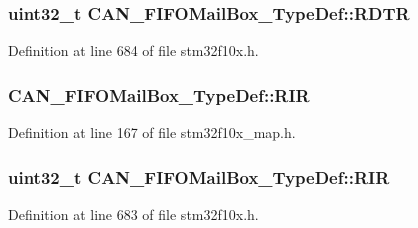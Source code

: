 \subsubsection[{\texorpdfstring{R\+D\+TR}{RDTR}}]{ {\bf uint32\+\_\+t} C\+A\+N\+\_\+\+F\+I\+F\+O\+Mail\+Box\+\_\+\+Type\+Def\+::\+R\+D\+TR}\hypertarget{struct_c_a_n___f_i_f_o_mail_box___type_def_a49d74ca8b402c2b9596bfcbe4cd051a9}{}\label{struct_c_a_n___f_i_f_o_mail_box___type_def_a49d74ca8b402c2b9596bfcbe4cd051a9}


Definition at line 684 of file stm32f10x.\+h.

\subsubsection[{\texorpdfstring{R\+IR}{RIR}}]{ C\+A\+N\+\_\+\+F\+I\+F\+O\+Mail\+Box\+\_\+\+Type\+Def\+::\+R\+IR}\hypertarget{struct_c_a_n___f_i_f_o_mail_box___type_def_a6bf9997062a89922d829e5339f891997}{}\label{struct_c_a_n___f_i_f_o_mail_box___type_def_a6bf9997062a89922d829e5339f891997}


Definition at line 167 of file stm32f10x\+\_\+map.\+h.

\subsubsection[{\texorpdfstring{R\+IR}{RIR}}]{ {\bf uint32\+\_\+t} C\+A\+N\+\_\+\+F\+I\+F\+O\+Mail\+Box\+\_\+\+Type\+Def\+::\+R\+IR}\hypertarget{struct_c_a_n___f_i_f_o_mail_box___type_def_a034504d43f7b16b320745a25b3a8f12d}{}\label{struct_c_a_n___f_i_f_o_mail_box___type_def_a034504d43f7b16b320745a25b3a8f12d}


Definition at line 683 of file stm32f10x.\+h.



